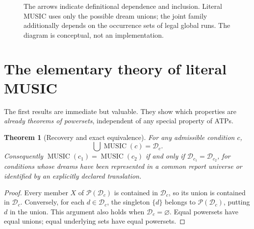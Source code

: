 \documentclass[11pt,letterpaper]{article}
\newtheorem{theorem}{Theorem}[section]
\theoremstyle{definition}
\theoremstyle{remark}
\newcommand{\PSet}{\mathcal{P}}
\newcommand{\Dream}{\mathcal{D}}
\newcommand{\Music}{\operatorname{MUSIC}}
\newcommand{\JMusic}{\operatorname{MUSIC}_{\mathrm J}}
\newcommand{\Runs}{\operatorname{Runs}}
\newcommand{\blank}{\varnothing}
\begin{document}
\begin{figure}[H]
\centering
{}
\caption{The arrows indicate definitional dependence and inclusion. Literal MUSIC uses only the possible dream unions; the joint family additionally depends on the occurrence sets of legal global runs. The diagram is conceptual, not an implementation.}
\label{fig:two-musics}
\end{figure}

\section{The elementary theory of literal MUSIC}
The first results are immediate but valuable. They show which properties are \emph{already theorems of powersets}, independent of any special property of ATPs.

\begin{theorem}[Recovery and exact equivalence]\label{thm:recovery}
For any admissible condition $c$,
\begin{equation}\label{eq:recover}
\bigcup\Music(c)=\Dream_c.
\end{equation}
Consequently $\Music(c_1)=\Music(c_2)$ if and only if $\Dream_{c_1}=\Dream_{c_2}$, for conditions whose dreams have been represented in a common report universe or identified by an explicitly declared translation.
\end{theorem}
\begin{proof}
Every member $X$ of $\PSet(\Dream_c)$ is contained in $\Dream_c$, so its union is contained in $\Dream_c$. Conversely, for each $d\in\Dream_c$, the singleton $\{d\}$ belongs to $\PSet(\Dream_c)$, putting $d$ in the union. This argument also holds when $\Dream_c=\blank$. Equal powersets have equal unions; equal underlying sets have equal powersets.
\end{proof}
\end{document}
